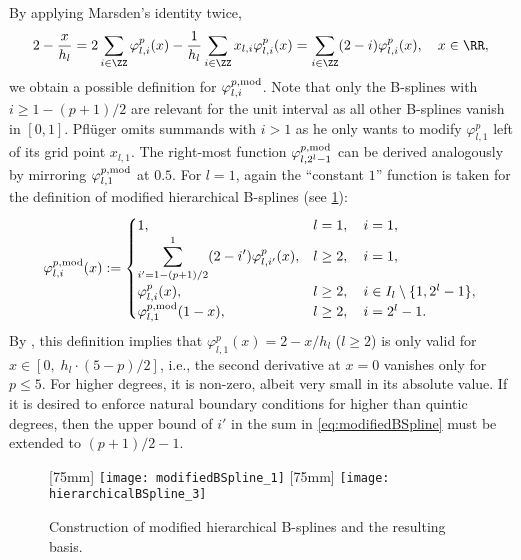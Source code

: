 By applying Marsden's identity twice,
\begin{equation}
  2 - \frac{x}{h_l}
  = 2 \sum_{i \in \ZZ} \varphi_{l,i}^p(x)
  - \frac{1}{h_l} \sum_{i \in \ZZ} x_{l,i} \varphi_{l,i}^p(x)
  = \sum_{i \in \ZZ} (2 - i) \varphi_{l,i}^p(x),\quad
  x \in \RR,
\end{equation}
we obtain a possible definition for $\varphi_{l,i}^{p,\mathrm{mod}}$.
Note that only the B-splines with $i \ge 1 - (p+1)/2$
are relevant for the unit interval as all other B-splines vanish in $[0, 1]$.
Pflüger omits summands with $i > 1$ as he only wants to modify
$\varphi_{l,1}^p$ left of its grid point $x_{l,1}$.
The right-most function $\varphi_{l,2^l-1}^{p,\mathrm{mod}}$ can be derived
analogously by mirroring $\varphi_{l,1}^{p,\mathrm{mod}}$ at $0.5$.
For $l = 1$, again the ``constant $1$'' function is taken for the definition
of modified hierarchical B-splines (see \cref{fig:modifiedBSpline}):
\begin{equation}
  \label{eq:modifiedBSpline}
  \varphi_{l,i}^{p,\mathrm{mod}}(x)
  :=
  \begin{cases}
    1,&
    l = 1,\quad i = 1,\\
    \displaystyle\sum_{i'=1-(p+1)/2}^1 (2 - i') \varphi_{l,i'}^p(x),&
    l \ge 2,\quad i = 1,\\
    \varphi_{l,i}^p(x),&
    l \ge 2,\quad i \in I_l \setminus \{1, 2^l - 1\},\\
    \varphi_{l,1}^{p,\mathrm{mod}}(1 - x),&
    l \ge 2,\quad i = 2^l - 1.
  \end{cases}
\end{equation}
By ,
this definition implies that
$\varphi_{l,1}^p(x) = 2 - x/h_l$ ($l \ge 2$)
is only valid for $x \in [0,\; h_l \cdot (5-p)/2]$, i.e.,
the second derivative at $x = 0$ vanishes only for $p \le 5$.
For higher degrees, it is non-zero, albeit very small
in its absolute value.
If it is desired to enforce natural boundary conditions
for higher than quintic degrees,
then the upper bound of $i'$ in the sum in \eqref{eq:modifiedBSpline}
must be extended to $(p+1)/2 - 1$.

\begin{figure}
  [75mm]{%
    \texttt{[image: modifiedBSpline\_1]}%
  }%
  \hfill%
  [75mm]{%
    \texttt{[image: hierarchicalBSpline\_3]}%
  }%
  \caption{%
    Construction of modified hierarchical B-splines and
    the resulting basis.%
  }
  \label{fig:modifiedBSpline}
\end{figure}



